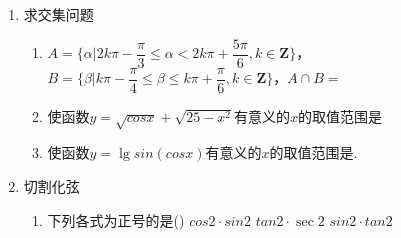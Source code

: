 \begin{enumerate}
\begin{enumerate}
\begin{jieda}
            因为$\dfrac{2cos\alpha}{|sin\alpha|} = 2cot\alpha$，所以$sin\alpha > 0$或$cos\alpha = 0$，又因为$\alpha \in (0, 2\pi)$，因此有$\alpha \in (0, \pi) \cup \{\dfrac{3\pi}{2}\}$
        \end{jieda}
        \item 已知$tan\theta = \dfrac{sin\alpha - cos\alpha}{sin\alpha + cos\alpha}$（$\alpha, \theta$都是锐角），则$\dfrac{sin\alpha - cos\alpha}{sin \theta} = $
        \begin{jieda}
            由$tan\theta = \dfrac{sin\alpha - cos\alpha}{sin\alpha + cos\alpha}$，且$\alpha, \theta$都是锐角知$sin\alpha - cos\alpha > 0, sin\alpha + cos\alpha > 0$，因此可得$\left \{ \begin{array}{l}
                sin\theta = \dfrac{sin\alpha - cos\alpha}{\sqrt{2}} \\
                cos\theta = \dfrac{sin\alpha + cos\alpha}{\sqrt{2}} 
            \end{array} \right.$，故$\dfrac{sin\alpha - cos\alpha}{sin \theta} = \sqrt{2}$
        \end{jieda}
    \end{enumerate}
    \item 求交集问题
    \begin{enumerate}
        \item $A = \{\alpha | 2k\pi - \dfrac{\pi}{3} \leq \alpha < 2k\pi + \dfrac{5\pi}{6}, k \in \mathbf{Z}\}$， $B = \{\beta |k\pi - \dfrac{\pi}{4} \leq \beta \leq k\pi + \dfrac{\pi}{6}, k \in \mathbf{Z}\}$，$A \cap B = $
        \item 使函数$y=\sqrt{cos x}+\sqrt{25-x^{2}}$有意义的$x$的取值范围是
        \item 使函数$y=\lg sin(cos{x})$有意义的$x$的取值范围是. 
    \end{enumerate}
    \item 切割化弦
    \begin{enumerate}
        \item 下列各式为正号的是\dotfill()
        {$ cos2\cdot sin2$}
        {$ tan2\cdot\sec2$}
        {$ sin2\cdot tan2$}
        \begin{jieda}

\end{jieda}
\end{enumerate}
\end{enumerate}
